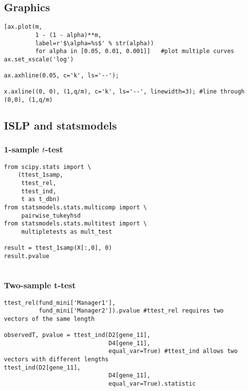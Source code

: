 \documentclass[
  letterpaper,
  DIV=11,
  numbers=noendperiod]{scrreprt}
\begin{document}
{{\subsection{Graphics}\label{graphics-11}

\begin{verbatim}
[ax.plot(m,
         1 - (1 - alpha)**m,
         label=r'$\alpha=%s$' % str(alpha))
         for alpha in [0.05, 0.01, 0.001]]   #plot multiple curves
ax.set_xscale('log')

ax.axhline(0.05, c='k', ls='--');

x.axline((0, 0), (1,q/m), c='k', ls='--', linewidth=3); #line through (0,0), (1,q/m)
\end{verbatim}

\subsection{ISLP and statsmodels}\label{islp-and-statsmodels-9}

\subsubsection{\texorpdfstring{1-sample
\(t\)-test}{1-sample t-test}}\label{sample-t-test}

\begin{verbatim}
from scipy.stats import \
    (ttest_1samp,
     ttest_rel,
     ttest_ind,
     t as t_dbn)
from statsmodels.stats.multicomp import \
     pairwise_tukeyhsd
from statsmodels.stats.multitest import \
     multipletests as mult_test

result = ttest_1samp(X[:,0], 0)
result.pvalue     
     
\end{verbatim}

\subsubsection{Two-sample t-test}\label{two-sample-t-test}

\begin{verbatim}
ttest_rel(fund_mini['Manager1'],
          fund_mini['Manager2']).pvalue #ttest_rel requires two vectors of the same length
          
observedT, pvalue = ttest_ind(D2[gene_11],
                              D4[gene_11],
                              equal_var=True) #ttest_ind allows two vectors with different lengths  
ttest_ind(D2[gene_11],
                              D4[gene_11],
                              equal_var=True).statistic                              
          

\end{verbatim}}}
\end{document}
